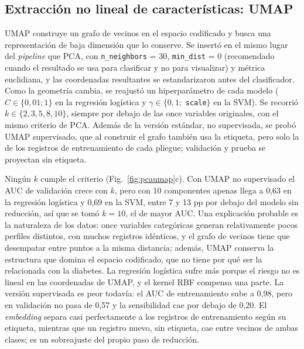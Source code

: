 \subsection{Extracción no lineal de características: UMAP}
UMAP construye un grafo de vecinos en el espacio codificado y busca una representación de baja dimensión que lo conserve. Se insertó en el mismo lugar del \textit{pipeline} que PCA, con \texttt{n\_neighbors} = 30, \texttt{min\_dist} = 0 (recomendado cuando el resultado se usa para clasificar y no para visualizar) y métrica euclidiana, y las coordenadas resultantes se estandarizaron antes del clasificador. Como la geometría cambia, se reajustó un hiperparámetro de cada modelo ($C\in\{0{,}01; 1\}$ en la regresión logística y $\gamma\in\{0{,}1;$ \texttt{scale}$\}$ en la SVM). Se recorrió $k\in\{2, 3, 5, 8, 10\}$, siempre por debajo de las once variables originales, con el mismo criterio de PCA. Además de la versión estándar, no supervisada, se probó UMAP supervisado, que al construir el grafo también usa la etiqueta, pero solo la de los registros de entrenamiento de cada pliegue; validación y prueba se proyectan sin etiqueta.

Ningún $k$ cumple el criterio (Fig.~\ref{fig:pcaumap}c). Con UMAP no supervisado el AUC de validación crece con $k$, pero con 10 componentes apenas llega a 0,63 en la regresión logística y 0,69 en la SVM, entre 7 y 13 pp por debajo del modelo sin reducción, así que se tomó $k=10$, el de mayor AUC. Una explicación probable es la naturaleza de los datos: once variables categóricas generan relativamente pocos perfiles distintos, con muchos registros idénticos, y el grafo de vecinos tiene que desempatar entre puntos a la misma distancia; además, UMAP conserva la estructura que domina el espacio codificado, que no tiene por qué ser la relacionada con la diabetes. La regresión logística sufre más porque el riesgo no es lineal en las coordenadas de UMAP, y el kernel RBF compensa una parte. La versión supervisada es peor todavía: el AUC de entrenamiento sube a 0,98, pero en validación no pasa de 0,57 y la sensibilidad cae por debajo de 0,20. El \textit{embedding} separa casi perfectamente a los registros de entrenamiento según su etiqueta, mientras que un registro nuevo, sin etiqueta, cae entre vecinos de ambas clases; es un sobreajuste del propio paso de reducción.

